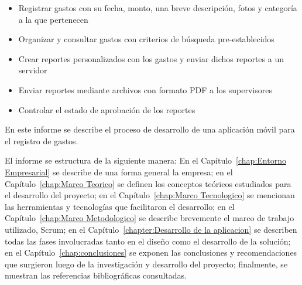 \begin{itemize}
\item Registrar gastos con su fecha, monto, una breve descripción, fotos y categoría a la que pertenecen
\item Organizar y consultar gastos con criterios de búsqueda pre-establecidos
\item Crear reportes personalizados con los gastos y enviar dichos reportes a un servidor
\item Enviar reportes mediante archivos con formato PDF a los supervisores
\item Controlar el estado de aprobación de los reportes
\end{itemize}

En este informe se describe el proceso de desarrollo de una aplicación móvil para el registro de gastos.

El informe se estructura de la siguiente manera: En el Capítulo~\ref{chap:Entorno Empresarial} se describe de una forma general la empresa; en el Capítulo~\ref{chap:Marco Teorico} se definen los conceptos teóricos estudiados para el desarrollo del proyecto; en el Capítulo~\ref{chap:Marco Tecnologico} se mencionan las herramientas y tecnologías que facilitaron el desarrollo; en el Capítulo~\ref{chap:Marco Metodologico} se describe brevemente el marco de trabajo utilizado, Scrum; en el Capítulo~\ref{chapter:Desarrollo de la aplicacion} se describen todas las fases involucradas tanto en el diseño como el desarrollo de la solución; en el Capítulo~\ref{chap:conclusiones} se exponen las conclusiones y recomendaciones que surgieron luego de la investigación y desarrollo del proyecto; finalmente, se muestran las referencias bibliográficas consultadas.